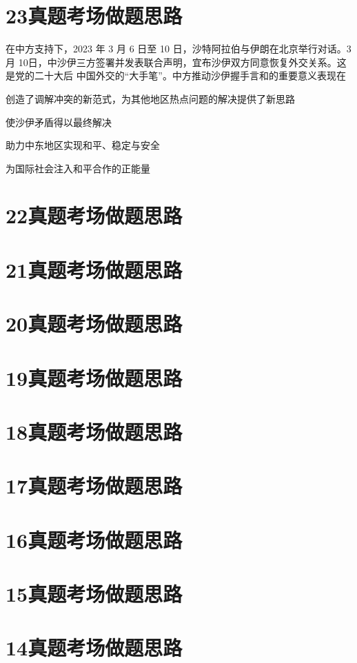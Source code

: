 \documentclass[lang=cn,blue,10pt,scheme=chinese,twocol]{zznote}
\begin{document}
\section{23真题考场做题思路}
\begin{exercise}在中方支持下，2023 年 3 月 6 日至 10 日，沙特阿拉伯与伊朗在北京举行对话。3 月 10日，中沙伊三方签署并发表联合声明，宜布沙伊双方同意恢复外交关系。这是党的二十大后 中国外交的“大手笔”。中方推动沙伊握手言和的重要意义表现在
	\begin{choice}
		\item 创造了调解冲突的新范式，为其他地区热点问题的解决提供了新思路
		\item 使沙伊矛盾得以最终解决
		\item 助力中东地区实现和平、稳定与安全
		\item 为国际社会注入和平合作的正能量
	\end{choice}
\end{exercise}
\section{22真题考场做题思路}
\section{21真题考场做题思路}
\section{20真题考场做题思路}
\section{19真题考场做题思路}
\section{18真题考场做题思路}
\section{17真题考场做题思路}
\section{16真题考场做题思路}
\section{15真题考场做题思路}
\section{14真题考场做题思路}
\end{document}
